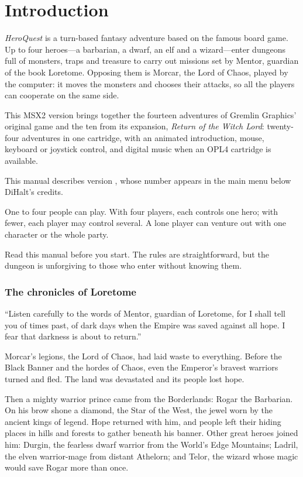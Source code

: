 \chapter{Introduction}
\textit{HeroQuest} is a turn-based fantasy adventure based on the famous board game. Up to four heroes---a barbarian, a dwarf, an elf and a wizard---enter dungeons full of monsters, traps and treasure to carry out missions set by Mentor, guardian of the book Loretome. Opposing them is Morcar, the Lord of Chaos, played by the computer: it moves the monsters and chooses their attacks, so all the players can cooperate on the same side.

This MSX2 version brings together the fourteen adventures of Gremlin Graphics' original game and the ten from its expansion, \textit{Return of the Witch Lord}: twenty-four adventures in one cartridge, with an animated introduction, mouse, keyboard or joystick control, and digital music when an OPL4 cartridge is available.

This manual describes version \versionjuego{}, whose number appears in the main menu below DiHalt's credits.

One to four people can play. With four players, each controls one hero; with fewer, each player may control several. A lone player can venture out with one character or the whole party.

Read this manual before you start. The rules are straightforward, but the dungeon is unforgiving to those who enter without knowing them.
\subsection{The chronicles of Loretome}
``Listen carefully to the words of Mentor, guardian of Loretome, for I shall tell you of times past, of dark days when the Empire was saved against all hope. I fear that darkness is about to return.''

Morcar's legions, the Lord of Chaos, had laid waste to everything. Before the Black Banner and the hordes of Chaos, even the Emperor's bravest warriors turned and fled. The land was devastated and its people lost hope.

Then a mighty warrior prince came from the Borderlands: Rogar the Barbarian. On his brow shone a diamond, the Star of the West, the jewel worn by the ancient kings of legend. Hope returned with him, and people left their hiding places in hills and forests to gather beneath his banner. Other great heroes joined him: Durgin, the fearless dwarf warrior from the World's Edge Mountains; Ladril, the elven warrior-mage from distant Athelorn; and Telor, the wizard whose magic would save Rogar more than once.

